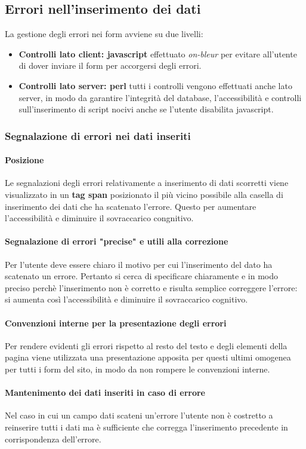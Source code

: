 \documentclass[12pt,a4paper]{article}
\begin{document}
\subsection{Errori nell'inserimento dei dati}
La gestione degli errori nei form avviene su due livelli:
\begin{itemize}
	\item \textbf{Controlli lato client: javascript} effettuato \textit{on-bleur} per evitare all'utente di dover inviare il form per accorgersi degli errori.
	\item \textbf{Controlli lato server: perl} tutti i controlli vengono effettuati anche lato server, in modo da garantire l'integrità del database, l'accessibilità e controlli sull'inserimento di script nocivi anche se l'utente disabilita javascript.
\end{itemize}
\subsubsection{Segnalazione di errori nei dati inseriti}
\paragraph{Posizione} Le segnalazioni degli errori relativamente a inserimento di dati scorretti viene visualizzato in un \textbf{tag span} posizionato il più vicino possibile alla casella di inserimento dei dati che ha scatenato l'errore. Questo per aumentare l'accessibilità e diminuire il sovraccarico congnitivo. 
\paragraph{Segnalazione di errori "precise" e utili alla correzione} Per l'utente deve essere chiaro il motivo per cui l'inserimento del dato ha scatenato un errore. Pertanto si cerca di specificare chiaramente e in modo preciso perchè l'inserimento non è corretto e risulta semplice correggere l'errore: si aumenta così l'accessibilità e diminuire il sovraccarico cognitivo. 
\paragraph{Convenzioni interne per la presentazione degli errori} Per rendere evidenti gli errori rispetto al resto del testo e degli elementi della pagina viene utilizzata una presentazione apposita per questi ultimi omogenea per tutti i form del sito, in modo da non rompere le convenzioni interne.
\paragraph{Mantenimento dei dati inseriti in caso di errore} 
Nel caso in cui un campo dati scateni un'errore l'utente non è costretto a reinserire tutti i dati ma è sufficiente che corregga l'inserimento precedente in corrispondenza dell'errore. 
\end{document}
